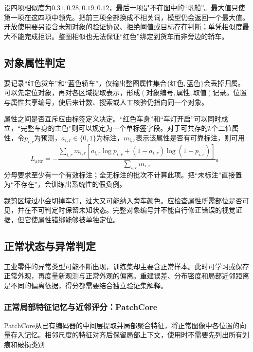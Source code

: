 设四项相似度为$0.31,0.28,0.19,0.12$，最后一项是不在图中的“帆船”。最大值只使第一项在这四项中领先。把前三项全部换成不相关词，模型仍会返回一个最大值。开放使用要另设含未知对象的验证协议、拒绝阈值或目标存在判断；单凭相似度最大不能完成拒识。整图相似也无法保证“红色”绑定到货车而非旁边的轿车。

\subsection{对象属性判定}
\label{sec:vision-recognition-attributes}

要记录“红色货车”和“蓝色轿车”，仅输出整图属性集合$\{\text{红色},\text{蓝色}\}$会丢掉归属。可以先定位对象，再对各区域提取表示，形成$(\text{对象编号},\text{属性},\text{取值})$记录。位置与属性共享编号，使后来计数、搜索或人工核验仍指向同一个对象。

属性之间是否互斥应由标签定义决定。“红色车身”和“车灯开启”可以同时成立，“完整车身的主色”则可以规定为一个单标签字段。对于可共存的$k$个二值属性，令$p_{i,r}$为预测，$a_{i,r}\in\{0,1\}$为标注，$m_{i,r}$表示该属性是否有可靠标注，则可用
\begin{equation}
 L_{\mathrm{attr}}=
 -\frac{\sum_{i,r}m_{i,r}
 [a_{i,r}\log p_{i,r}+(1-a_{i,r})\log(1-p_{i,r})]}
 {\sum_{i,r}m_{i,r}}\text{。}
 \label{eq:vision-attribute-loss}
\end{equation}
分母要求至少有一个有效标注；全无标注的批次不计算此项。把“未标注”直接置为“不存在”，会训练出系统性的假负例。

裁剪区域过小会切掉车灯，过大又可能纳入旁车颜色。应检查属性所需部位是否可见，并在不可判定时保留未知状态。完整对象编号并不能自行修正错误的视觉证据，但它使属性错绑能够被单独定位。

\subsection{正常状态与异常判定}
\label{sec:vision-recognition-anomaly}

工业零件的异常类型可能不断出现，训练集却主要含正常样本。此时可学习或保存正常外观，再度量新观测与正常外观的偏离。重建误差、分布密度和局部近邻距离是不同的偏离依据，得分都需要结合独立验证集解释。

\subsubsection{正常局部特征记忆与近邻评分：PatchCore}
\label{sec:vision-recognition-patchcore}

PatchCore从已有编码器的中间层提取并局部聚合特征，将正常图像中各位置的向量存入记忆。相邻尺度的特征对齐后保留局部上下文，使用时不需要先列出所有划痕和破损类别

